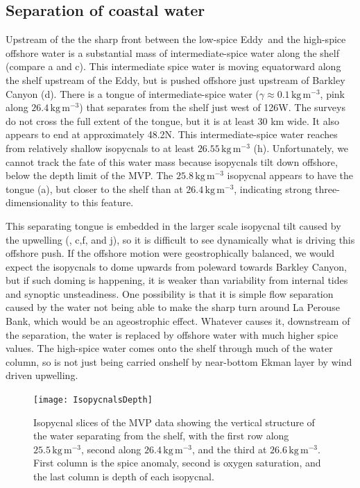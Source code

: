 \documentclass[draft]{agujournal2019}
\newcommand*{\Eddy}{{\sc Eddy}}
\begin{document}
\subsection{Separation of coastal water}

Upstream of the the sharp front between the low-spice \Eddy\ and the high-spice offshore water is a substantial mass of intermediate-spice water along the shelf (compare a and c).   This intermediate spice water is moving equatorward along the shelf upstream of the \Eddy, but is pushed offshore just upstream of Barkley Canyon (d).  There is a tongue of intermediate-spice water ($\gamma \approx 0.1\,\mathrm{kg\,m^{-3}}$, pink along $26.4\,\mathrm{kg\,m^{-3}}$) that separates from the shelf just west of 126\textdegree W. The surveys do not cross the full extent of the  tongue, but it is at least 30 km wide. It also appears to end at approximately 48.2\textdegree N.  This intermediate-spice water reaches from relatively shallow isopycnals to at least $26.55\,\mathrm{kg\,m^{-3}}$ (h).  Unfortunately, we cannot track the fate of this water mass because isopycnals tilt down offshore, below the depth limit of the MVP.   The $25.8\,\mathrm{kg\,m^{-3}}$ isopycnal appears to have the tongue (a), but closer to the shelf than at $26.4\,\mathrm{kg\,m^{-3}}$, indicating strong three-dimensionality to this feature.

This separating tongue is embedded in the larger scale isopycnal tilt caused by the upwelling (, c,f, and j), so it is difficult to see dynamically what is driving this offshore push.  If the offshore motion were geostrophically balanced, we would expect the isopycnals to dome upwards from poleward towards Barkley Canyon, but if such doming is happening, it is weaker than variability from internal tides and synoptic unsteadiness. One possibility is that it is simple flow separation caused by the water not being able to make the sharp turn around La Perouse Bank, which would be an ageostrophic effect.  Whatever causes it, downstream of the separation, the water is replaced by offshore water with much higher spice values.  The high-spice water comes onto the shelf through much of the water column, so is not just being carried onshelf by near-bottom Ekman layer by wind driven upwelling.

\begin{figure}[htbp]
  \begin{center}
    \texttt{[image: IsopycnalsDepth]}
    \caption{Isopycnal slices of the MVP data showing the vertical structure of the water separating from the shelf, with the first row along $25.5 \,\mathrm{kg\,m^{-3}}$, second along $26.4\,\mathrm{kg\,m^{-3}}$, and the third at $26.6\,\mathrm{kg\,m^{-3}}$.  First column is the spice anomaly, second is oxygen saturation, and the last column is depth of each isopycnal.
      \label{fig:IsopycnalsDepth} }
  \end{center}
\end{figure}
\end{document}
